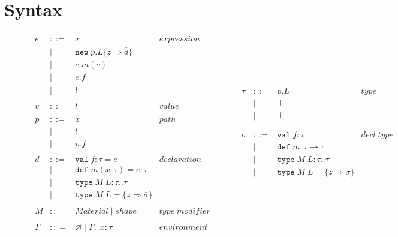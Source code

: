 \documentclass{llncs}
\numberwithin{subcase}{casethm}
\numberwithin{casethm}{theorem}
\numberwithin{casethm}{lemma}
\begin{document}
\section{Syntax}

\begin{figure}[h]
\[
\begin{array}{lll}
\begin{array}{lllr}
e & ::= & x & expression \\
& | & \texttt{new} \; p.L\{z \Rightarrow \overline{d}\}&\\
& | & e.m(e) &\\
& | & e.f &\\
& | & l &\\
&&\\
v & ::= & l & value \\
&&\\
p & ::= & x & path \\
  & |   & l &\\
  & |   & p.f &\\
&&\\
d & ::= & \texttt{val} \; f : \tau = e & declaration \\
  & |   & \texttt{def} \; m(x:\tau) = e : \tau &\\
  & |   & \texttt{type} \; M \; L : \tau .. \tau&\\
  & |   & \texttt{type} \; M \; L = \{z \Rightarrow \overline{\sigma}\}&\\
&&\\
M & :: = & Material \; | \; shape &  type \; modifier \\
&&\\
\Gamma & :: = & \varnothing \; | \; \Gamma,\; x : \tau & environment \\
 \end{array}
& ~~~~~~
&
\begin{array}{lllr}
\tau & ::= & p.L & type \\
& | & \top \\
& | & \bot \\
&&\\
&&\\
\sigma & ::= & \texttt{val} \; f:\tau & decl \; type\\
		& |   & \texttt{def} \; m:\tau \rightarrow \tau \\
		& |   & \texttt{type} \; M \; L : \tau .. \tau &\\
		& |   & \texttt{type} \; M \; L = \{z \Rightarrow \overline{\sigma}\} &\\
&&\\

\end{array}
\end{array}\]
\end{figure}
\end{document}
